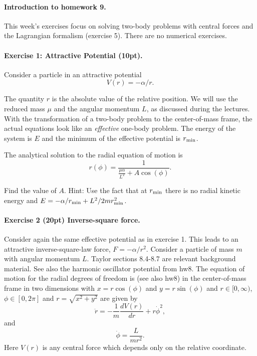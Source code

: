\documentclass[%
oneside,                 %
final,                   %
10pt]{article}
\begin{document}
\noindent
\paragraph{Introduction to homework 9.}
This week's exercises focus on solving
two-body  problems with central forces and the Lagrangian formalism (exercise 5). There are no numerical exercises. 

\paragraph{Exercise 1: Attractive Potential (10pt).}
Consider a particle in an attractive potential
\[
V(r)=-\alpha/r.
\]

The quantity $r$ is the absolute value of the relative position. We
will use the reduced mass $\mu$ and the angular momentum $L$, as
discussed during the lectures. With the transformation of a two-body
problem to the center-of-mass frame, the actual equations look like an
\emph{effective} one-body problem. The energy of the system is $E$ and the
minimum of the effective potential is $r_{\rm min}$.

The analytical solution to the radial equation of motion is
\[
r(\phi) = \frac{1}{\frac{\mu\alpha}{L^2}+A\cos{(\phi)}}.
\]

Find the value of $A$. Hint: Use the fact that at $r_{\rm min}$
there is no radial kinetic energy and $E=-\alpha/r_{\rm min}+L^2/2mr_{\rm min}^2$.

\paragraph{Exercise 2 (20pt) Inverse-square force.}
Consider again the same effective potential as in exercise 1. This leads to an attractive inverse-square-law force, $F=-\alpha/r^2$. Consider a particle of mass $m$ with angular momentum $L$. Taylor sections 8.4-8.7 are relevant background material.  See also the harmonic oscillator potential from hw8. The equation of motion for the radial degrees of freedom is (see also hw8) in the center-of-mass frame in two dimensions with $x=r\cos{(\phi)}$ and $y=r\sin{(\phi)}$ and
$r\in [0,\infty)$, $\phi\in [0,2\pi]$ and $r=\sqrt{x^2+y^2}$ are given by
\[
\ddot{r}=-\frac{1}{m}\frac{dV(r)}{dr}+r\dot{\phi}^2,
\]
and
\[
\dot{\phi}=\frac{L}{m r^2}.
\]
Here $V(r)$ is any central force which depends only on the relative coordinate.
\end{document}
